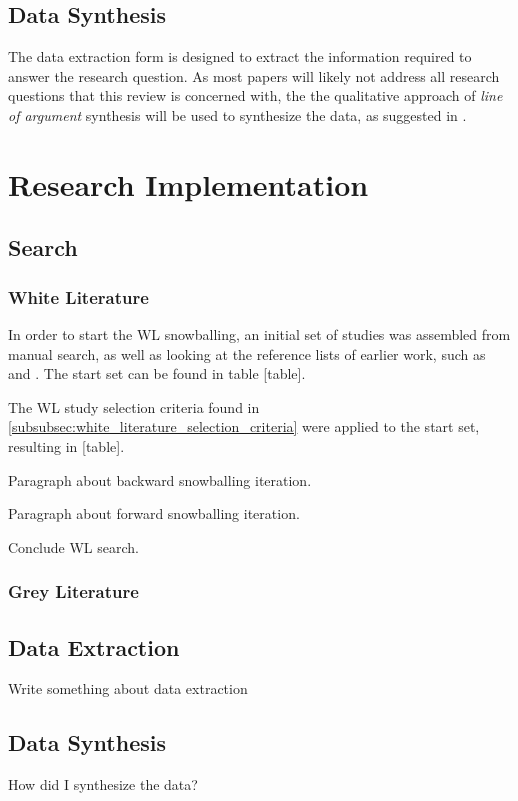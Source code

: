 \subsection{Data Synthesis}
The data extraction form is designed to extract the information required to answer the research question.
As most papers will likely not address all research questions that this review is concerned with, the the qualitative approach of \textit{line of argument} synthesis will be used to synthesize the data, as suggested in \cite{Kitchenham07guidelinesfor}.

\section{Research Implementation}
\label{sec:research_implementation}

\subsection{Search}
\subsubsection{White Literature}
In order to start the WL snowballing, an initial set of studies was assembled from manual search, as well as looking at the reference lists of earlier work, such as \cite{John2021} and \cite{MartinezFernandez2021}.
The start set can be found in table [table].

The WL study selection criteria found in \cref{subsubsec:white_literature_selection_criteria} were applied to the start set, resulting in [table].

Paragraph about backward snowballing iteration.

Paragraph about forward snowballing iteration.

Conclude WL search.

\subsubsection{Grey Literature}

\subsection{Data Extraction}
Write something about data extraction

\subsection{Data Synthesis}
How did I synthesize the data?
